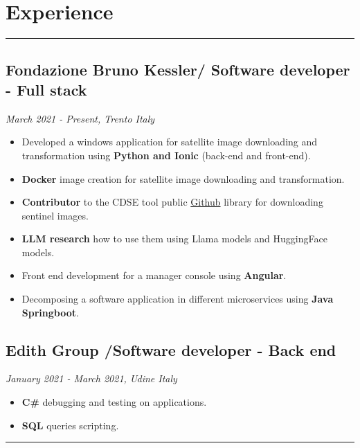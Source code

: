 \documentclass[a4paper,10pt]{article}
\begin{document}
\begin{minipage}[t]{0.25\textwidth}
    \section*{Experience}
    \vspace{8.1cm} %
    \rule{0.6cm}{0.3mm}
\end{minipage}
\hfill
\begin{minipage}[t]{0.75\textwidth}
     \subsection*{Fondazione Bruno Kessler/ Software developer - Full stack}
    \textit{ March 2021 - Present, Trento Italy  } \\
    \begin{itemize}[leftmargin=1cm]
        \item Developed a windows application for satellite image downloading and transformation using \textbf{Python and Ionic} (back-end and front-end).
        \item \textbf{Docker} image creation for satellite image downloading and transformation.
        \item \textbf{Contributor} to the CDSE tool public \href{https://github.com/CDSETool/CDSETool}{Github} library for downloading sentinel images.
        \item \textbf{LLM research} how to use them using Llama models and HuggingFace models.
        \item Front end development for a manager console using \textbf{Angular}.
        \item Decomposing a software application in different microservices using \textbf{Java Springboot}.
    \end{itemize}
    \vspace{0.2cm} %
    \subsection*{Edith Group /Software developer - Back end}
    \textit{January 2021 - March 2021, Udine Italy} \\
    \begin{itemize}[leftmargin=1cm]
        \item \textbf{C\#} debugging and testing on applications.
        \item \textbf{SQL} queries scripting.
    \end{itemize}
    \rule{\linewidth}{0.5mm}
\end{minipage}
\end{document}
